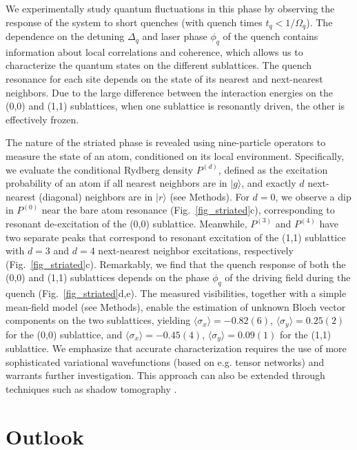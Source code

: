 \documentclass[reprint,twocolumn,secnumarabic,amssymb, aps, prl]{revtex4-1}
\begin{document}
We experimentally study quantum fluctuations in this phase by observing the response of the system to short quenches (with quench times $t_q < 1/\Omega_q$). The dependence on the detuning $\Delta_q$ and laser phase $\phi_q$ of the quench contains information about local correlations and coherence, which allows us to characterize the quantum states on the different sublattices. The quench resonance for each site depends on the state of its nearest and next-nearest neighbors. Due to the large difference between the interaction energies on the (0,0) and (1,1) sublattices, when one sublattice is resonantly driven, the other is effectively frozen.


The nature of the striated phase is revealed using nine-particle operators to measure the state of an atom, conditioned on its local environment. Specifically, we evaluate the conditional Rydberg density $P^{(d)}$, defined as the excitation probability of an atom if all nearest neighbors are in $|g\rangle$, and exactly $d$ next-nearest (diagonal) neighbors are in $|r\rangle$ (see Methods). For $d=0$, we observe a dip in $P^{(0)}$ near the bare atom resonance (Fig.~\ref{fig_striated}c), corresponding to resonant de-excitation of the (0,0) sublattice. Meanwhile, $P^{(3)}$ and $P^{(4)}$ have two separate peaks that correspond to resonant excitation of the (1,1) sublattice with $d=3$ and $d=4$ next-nearest neighbor excitations, respectively (Fig.~\ref{fig_striated}c). Remarkably, we find that the quench response of both the (0,0) and (1,1) sublattices depends on the phase $\phi_q$ of the driving field during the quench (Fig.~\ref{fig_striated}d,e). The measured visibilities, together with a simple mean-field model (see Methods),  enable the estimation of unknown Bloch vector components on the two sublattices, yielding $\langle \sigma_x\rangle = -0.82(6)$, $\langle \sigma_y\rangle = 0.25(2)$ for the (0,0) sublattice, and $\langle \sigma_x \rangle = -0.45(4)$, $\langle \sigma_y\rangle = 0.09(1)$ for the (1,1) sublattice. We emphasize that accurate characterization requires the use of more sophisticated variational wavefunctions (based on e.g. tensor networks) and warrants further  investigation. This approach can also be  extended through techniques such as shadow tomography \cite{PreskillShadowTomography2020}.


\section{Outlook}
\end{document}
